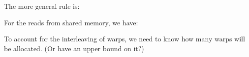 The more general rule is:
    \begin{mathpar}
        \end{mathpar}

For the reads from shared memory, we have:

\begin{mathpar}
\end{mathpar}
    
To account for the interleaving of warps, we need to know how many warps will be allocated. (Or have an upper bound on it?)

